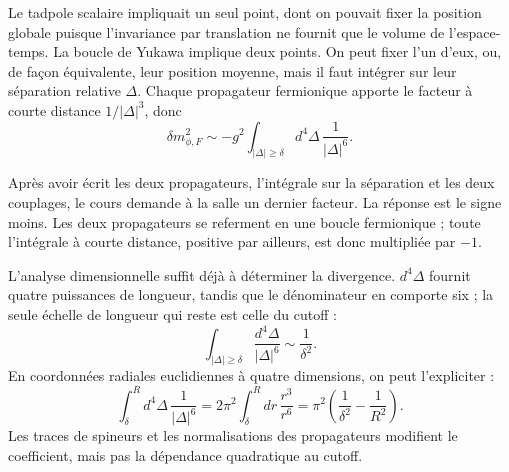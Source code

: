 Le tadpole scalaire impliquait un seul point, dont on pouvait fixer la position globale puisque l’invariance par translation ne fournit que le volume de l’espace-temps. La boucle de Yukawa implique deux points. On peut fixer l’un d’eux, ou, de façon équivalente, leur position moyenne, mais il faut intégrer sur leur séparation relative \(\Delta\). Chaque propagateur fermionique apporte le facteur à courte distance \(1/|\Delta|^3\), donc
\begin{equation}
\delta m_{\phi,F}^2
\sim
-g^2\int_{|\Delta|\geq\delta}d^4\Delta\,
\frac{1}{|\Delta|^6}.
\end{equation}

Après avoir écrit les deux propagateurs, l’intégrale sur la séparation et les deux couplages, le cours demande à la salle un dernier facteur. La réponse est le signe moins. Les deux propagateurs se referment en une boucle fermionique ; toute l’intégrale à courte distance, positive par ailleurs, est donc multipliée par \(-1\).

L’analyse dimensionnelle suffit déjà à déterminer la divergence. \(d^4\Delta\) fournit quatre puissances de longueur, tandis que le dénominateur en comporte six ; la seule échelle de longueur qui reste est celle du cutoff :
\begin{equation}
\int_{|\Delta|\geq\delta}
\frac{d^4\Delta}{|\Delta|^6}
\sim\frac{1}{\delta^2}.
\end{equation}
En coordonnées radiales euclidiennes à quatre dimensions, on peut l’expliciter :
\begin{equation}
\int_{\delta}^{R}d^4\Delta\,\frac{1}{|\Delta|^6}
=2\pi^2\int_{\delta}^{R}dr\,\frac{r^3}{r^6}
=\pi^2\left(\frac{1}{\delta^2}-\frac{1}{R^2}\right).
\end{equation}
Les traces de spineurs et les normalisations des propagateurs modifient le coefficient, mais pas la dépendance quadratique au cutoff.

\begin{classroomqa}
\end{classroomqa}

